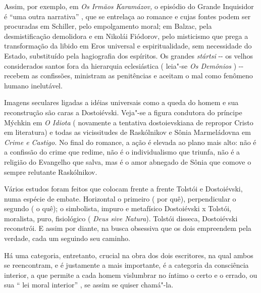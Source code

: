 Assim, por exemplo, em \emph{Os Irmãos Karamázov,} o episódio do Grande
Inquisidor é ``uma outra narrativa'' , que se entrelaça ao romance e
cujas fontes podem ser procuradas em Schiller, pelo empolgamento moral;
em Balzac, pela desmistificação demolidora e em Nikolái Fiódorov, pelo
misticismo que prega a transformação da libido em Eros universal e
espiritualidade, sem necessidade do Estado, substituído pela hagiografia
dos espíritos. Os grandes \emph{stártsi} -\/- os velhos considerados
santos fora da hierarquia eclesiástica ( leia"-se \emph{Os Demônios} )
-\/- recebem as confissões, ministram as penitências e aceitam o mal
como fenômeno humano inelutável.

Imagens seculares ligadas a idéias universais como a queda do homem e
sua reconstrução são caras a Dostoiévski. Veja"-se a figura condutora do
príncipe Mýchkin em \emph{O Idiota} ( novamente a tentativa
dostoievskiana de repropor Cristo em literatura) e todas as vicissitudes
de Raskólnikov e Sônia Marmeládovna em \emph{Crime e Castigo.} No final
do romance, a ação é elevada ao plano mais alto: não é a confissão do
crime que redime, não é o individualismo que triunfa, não é a religião
do Evangelho que salva, mas é o amor abnegado de Sônia que comove o
sempre relutante Raskólnikov.

Vários estudos foram feitos que colocam frente a frente Tolstói e
Dostoiévski, numa espécie de embate. Horizontal o primeiro ( por quê),
perpendicular o segundo ( o quê); o simbolista, impuro e metafísico
Dostoiévski x Tolstói, moralista, puro, fisiológico ( \emph{Deus sive
Natura}). Tolstói disseca, Dostoiévski reconstrói. E assim por diante,
na busca obsessiva que os dois empreendem pela verdade, cada um seguindo
seu caminho.

Há uma categoria, entretanto, crucial na obra dos dois escritores, na
qual ambos se reencontram, e é justamente a mais importante, é a
categoria da consciência interior, a que permite a cada homem vislumbrar
no íntimo o certo e o errado, ou sua `` lei moral interior'' , se assim
se quiser chamá"-la.

